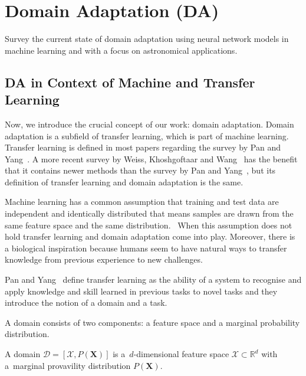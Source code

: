 \chapter{Domain Adaptation (DA)}
\label{da_chapter}

Survey the current state of domain adaptation using neural network models in machine learning and with a focus on astronomical applications.


\section{DA in Context of Machine and Transfer Learning}

Now, we introduce the crucial concept of our work: domain adaptation.
Domain adaptation is a subfield of transfer learning,
which is part of machine learning.
Transfer learning is defined in most papers regarding the survey by Pan and Yang~\cite{pan2010}.
A more recent survey by Weiss, Khoshgoftaar and Wang~\cite{weiss2016} has the benefit
that it contains newer methods than the survey by Pan and Yang~\cite{pan2010},
but its definition of transfer learning and domain adaptation is the same.

Machine learning has a common assumption that training and test data are independent and identically distributed
that means samples are drawn from the same feature space and the same distribution.~\cite{daume2006}
When this assumption does not hold transfer learning and domain adaptation come into play.
Moreover, there is a biological inspiration
because humans seem to have natural ways to transfer knowledge from previous experience to new challenges.~\cite{torrey2010}

Pan and Yang~\cite{pan2010} define transfer learning
as the ability of a system to recognise and apply knowledge and skill
learned in previous tasks to novel tasks
and they introduce the notion of a domain and a task.

A domain consists of two components: a feature space and a marginal probability distribution.

\begin{definition}
	A domain \(\mathcal{D} = [\mathcal{X}, P(\mathbf{X})]\)
	is a~\(d\)-dimensional feature space \(\mathcal{X} \subset \mathbb{R}^d\)
	with a~marginal provavility distribution \(P(\mathbf{X})\).~\cite{pan2010}
\end{definition}

